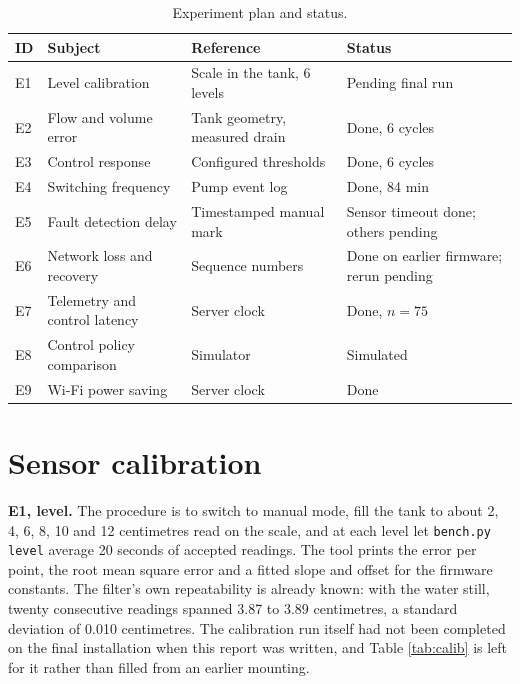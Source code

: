 \begin{table}[H]
\caption{Experiment plan and status.}
\label{tab:expsummary}
\centering
\renewcommand{\arraystretch}{1.05}
\begin{tabular}{|p{0.7cm}|p{4.2cm}|p{4.4cm}|p{3.4cm}|}
\hline
\rowcolor[HTML]{B7E1F0}
\textbf{ID} & \textbf{Subject} & \textbf{Reference} & \textbf{Status} \\
\hline
E1 & Level calibration & Scale in the tank, 6 levels & Pending final run \\
\hline
E2 & Flow and volume error & Tank geometry, measured drain & Done, 6 cycles \\
\hline
E3 & Control response & Configured thresholds & Done, 6 cycles \\
\hline
E4 & Switching frequency & Pump event log & Done, 84 min \\
\hline
E5 & Fault detection delay & Timestamped manual mark & Sensor timeout done; others pending \\
\hline
E6 & Network loss and recovery & Sequence numbers & Done on earlier firmware; rerun pending \\
\hline
E7 & Telemetry and control latency & Server clock & Done, $n = 75$ \\
\hline
E8 & Control policy comparison & Simulator & Simulated \\
\hline
E9 & Wi-Fi power saving & Server clock & Done \\
\hline
\end{tabular}
\end{table}

\section{Sensor calibration}

\textbf{E1, level.} The procedure is to switch to manual mode, fill the tank to about 2, 4, 6, 8, 10 and 12 centimetres read on the scale, and at each level let \texttt{bench.py level} average 20 seconds of accepted readings. The tool prints the error per point, the root mean square error and a fitted slope and offset for the firmware constants. The filter's own repeatability is already known: with the water still, twenty consecutive readings spanned 3.87 to 3.89 centimetres, a standard deviation of 0.010 centimetres. The calibration run itself had not been completed on the final installation when this report was written, and Table \ref{tab:calib} is left for it rather than filled from an earlier mounting.


